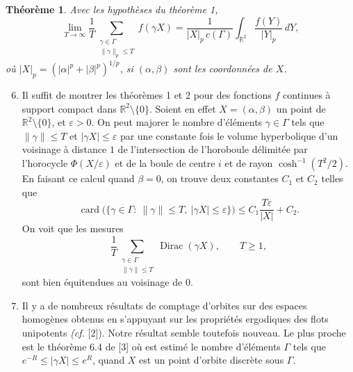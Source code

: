 \documentclass[11pt]{article}
\newtheorem{theoreme}{Théorème}
\theoremstyle{remark}
\newcommand{\R}{\mathbb{R}}
\newcommand{\card}{\operatorname{card}}
\newcommand{\Dirac}{\operatorname{Dirac}}
\begin{document}
\begin{theoreme}
Avec les hypothèses du théorème 1,
\begin{equation}\tag{$*$$_p$}
\lim_{T\to\infty}\frac{1}{T}\sum_{\substack{\gamma\in\Gamma\\ \|\gamma\|_p\le T}} f(\gamma X)
=\frac{1}{|X|_p\,c(\Gamma)}\int_{\R^2}\frac{f(Y)}{|Y|_p}\,dY,
\end{equation}
où $|X|_p=(|\alpha|^p+|\beta|^p)^{1/p}$, si $(\alpha,\beta)$ sont les coordonnées de $X$.
\end{theoreme}

\begin{enumerate}
\setcounter{enumi}{5}
\item Il suffit de montrer les théorèmes 1 et 2 pour des fonctions $f$ continues à support compact dans $\R^2\setminus\{0\}$. Soient en effet $X=(\alpha,\beta)$ un point de $\R^2\setminus\{0\}$, et $\varepsilon>0$. On peut majorer le nombre d'éléments $\gamma\in\Gamma$ tels que $\|\gamma\|\le T$ et $|\gamma X|\le\varepsilon$ par une constante fois le volume hyperbolique d'un voisinage à distance $1$ de l'intersection de l'horoboule délimitée par l'horocycle $\Phi(X/\varepsilon)$ et de la boule de centre $i$ et de rayon $\cosh^{-1}(T^2/2)$. En faisant ce calcul quand $\beta=0$, on trouve deux constantes $C_1$ et $C_2$ telles que
\[
\card\bigl(\{\gamma\in\Gamma:\ \|\gamma\|\le T,\ |\gamma X|\le\varepsilon\}\bigr)
\le C_1\frac{T\varepsilon}{|X|}+C_2.
\]
On voit que les mesures
\[
\frac{1}{T}\sum_{\substack{\gamma\in\Gamma\\ \|\gamma\|\le T}}\Dirac(\gamma X),\qquad T\ge1,
\]
sont bien équitendues au voisinage de $0$.

\item Il y a de nombreux résultats de comptage d'orbites sur des espaces homogènes obtenus en s'appuyant sur les propriétés ergodiques des flots unipotents \emph{(cf.} [2]). Notre résultat semble toutefois nouveau. Le plus proche est le théorème 6.4 de [3] où est estimé le nombre d'éléments $\Gamma$ tels que
$e^{-R}\le |\gamma X|\le e^R$, quand $X$ est un point d'orbite discrète sous $\Gamma$.
\end{enumerate}
\end{document}
